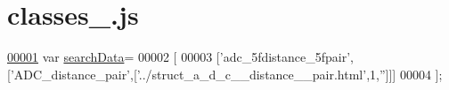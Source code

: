 \hypertarget{classes__0_8js_source}{}\section{classes\+\_.\+js}
\label{classes__0_8js_source}

\begin{DoxyCode}
\hypertarget{classes__0_8js_source.tex_l00001}{}\hyperlink{classes__0_8js_ad01a7523f103d6242ef9b0451861231e}{00001} var \hyperlink{classes__0_8js_ad01a7523f103d6242ef9b0451861231e}{searchData}=
00002 [
00003   [\textcolor{stringliteral}{'adc\_5fdistance\_5fpair'},[\textcolor{stringliteral}{'ADC\_distance\_pair'},[\textcolor{stringliteral}{'../struct\_a\_d\_c\_\_distance\_\_pair.html'},1,\textcolor{stringliteral}{''}]]]
00004 ];
\end{DoxyCode}
